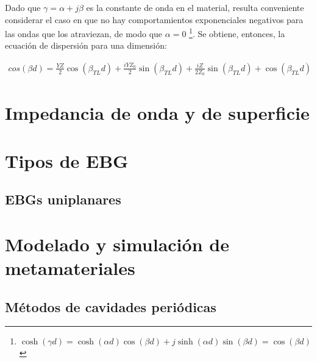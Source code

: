 Dado que $\gamma = \alpha + j \beta$ es la constante de onda en el material, resulta conveniente considerar el caso en que no hay comportamientos exponenciales negativos para las ondas que los atraviezan, de modo que $\alpha=0$ \footnote{$\cosh (\gamma d) = \cosh(\alpha d)\cos(\beta d) + j \sinh(\alpha d) \sin(\beta d) = \cos (\beta d)$}. Se obtiene, entonces, la ecuación de dispersión para una dimensión:

\begin{align}
	cos(\beta d) = \frac{Y Z}{2} \cos{\left (\beta_{TL} d \right )} + \frac{i Y Z_{0}}{2} \sin{\left (\beta_{TL} d \right )} + \frac{i Z}{2 Z_{0}} \sin{\left (\beta_{TL} d \right )} + \cos{\left (\beta_{TL} d \right )}
\end{align}

\section{Impedancia de onda y de superficie}
\label{sec_imp_superficie}
\lipsum

\lipsum
\section{Tipos de EBG}
\label{sec_tipos_mtm}
\lipsum[1]
\subsection{EBGs uniplanares}
\label{subsec_ebg_uniplanar}
\lipsum
\section{Modelado y simulación de metamateriales}
\label{sec_simulacion_mtm}
\lipsum
\subsection{Métodos de cavidades periódicas}
\label{subsec_eigenfunctions}
\lipsum
